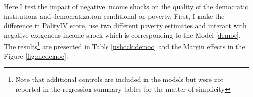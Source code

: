 \documentclass[a4paper, 12pt]{article}
\begin{document}
	\noindent Here I test the impact of negative income shocks on the quality of the democratic institutions and democratization conditional on poverty. First, I make the difference in PolityIV score, use two different poverty estimates and interact with negative exogenous income shock which is corresponding to the Model \eqref{democ}. The results\footnote{Note that additional controls are included in the models but were not reported in the regression summary tables for the matter of simplicity} are presented in Table \ref{nshock:democ} and the Margin effects in the Figure \ref{fig:medemoc}.
	\\
	\begin{table}[!htbp] \centering 
  \caption{Negative income shocks and democratization} 
  \label{nshock:democ} 
\end{table}
\end{document}
